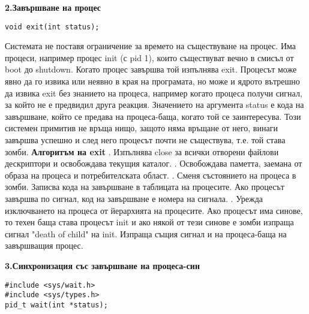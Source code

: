 \documentclass{article}
\begin{document}
\textbf{2.Завършване на процес}
\begin{lstlisting}[style=CStyle]
void exit(int status);
\end{lstlisting}
Системата не поставя ограничение за времето на съществуване на процес. Има процеси, например процес init (с pid 1), които
съществуват вечно в смисъл от boot до shutdown. Когато процес завършва той изпълнява exit. Процесът може явно да го извика или
неявно в края на програмата, но може и ядрото вътрешно да извика exit без знанието на процеса, например когато процеса получи
сигнал, за който не е предвидил друга реакция. Значението на аргумента status е кода на завършване, който се предава на
процеса-баща, когато той се заинтересува. Този системен примитив не връща нищо, защото няма връщане от него, винаги завършва
успешно и след него процесът почти не съществува, т.е. той става зомби. \newline
\textbf{Алгоритъм на exit} \newline{}. Изпълнява close за всички отворени файлови дескриптори и освобождава текущия каталог. . Освобождава паметта, заемана от образа на процеса и потребителската област. . Сменя състоянието на процеса в зомби. Записва кода на завършване в таблицата на процесите. Ако процесът завършва по сигнал,
код на завършване е номера на сигнала. . Урежда изключването на процеса от йерархията на процесите. Ако процесът има синове, то техен баща става процесът init и ако
някой от тези синове е зомби изпраща сигнал "death of child" на init. Изпраща същия сигнал и на процеса-баща на завършващия процес. \newline

\textbf{3.Синхронизация със завършване на процеса-син}
\begin{lstlisting}[style=CStyle]
#include <sys/wait.h>
#include <sys/types.h>
pid_t wait(int *status);
\end{lstlisting}
\end{document}

